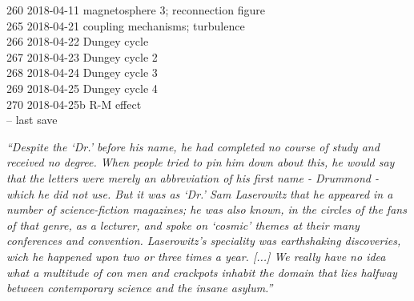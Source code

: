 \begin{footnotesize}
260	2018-04-11	magnetosphere 3; reconnection figure\\
265	2018-04-21	coupling mechanisms; turbulence\\
266	2018-04-22	Dungey cycle\\
267	2018-04-23	Dungey cycle 2\\
268	2018-04-24	Dungey cycle 3\\
269	2018-04-25	Dungey cycle 4\\
270	2018-04-25b	R-M effect\\
\vspace{\baselineskip}
\ISOToday{} \thistime{} -- last save
\end{footnotesize}


\clearpage


\vspace*{\fill}


\noindent \textit{``Despite the `Dr.' before his name, he had completed no course of study and received no degree. When people tried to pin him down about this, he would say that the letters were merely an abbreviation of his first name - Drummond - which he did not use. But it was as `Dr.' Sam Laserowitz that he appeared in a number of science-fiction magazines; he was also known, in the circles of the fans of that genre, as a lecturer, and spoke on `cosmic' themes at their many conferences and convention. Laserowitz's speciality was earthshaking discoveries, wich he happened upon two or three times a year. [...] We really have no idea what a multitude of con men and crackpots inhabit the domain that lies halfway between contemporary science and the insane asylum.''}
\vspace{\baselineskip}

